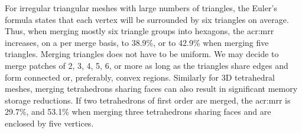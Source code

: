 For irregular triangular meshes with large numbers of triangles, the Euler's formula \cite[p.~28]{bib:Berg2008CGA} states that each vertex will be surrounded by six triangles on average.
Thus, when merging mostly six triangle groups into hexagons, the \gls{acr:mrr} increases, on a per merge basis, to 38.9\%, or to 42.9\% when merging five triangles.
Merging triangles does not have to be uniform.
We may decide to merge patches of 2, 3, 4, 5, 6, or more as long as the triangles share edges and form connected or, preferably, convex regions.
Similarly for 3D tetrahedral meshes, merging tetrahedrons sharing faces can also result in significant memory storage reductions.
If two tetrahedrons of first order are merged, the \gls{acr:mrr} is 29.7\%, and 53.1\% when merging three tetrahedrons sharing faces and are enclosed by five vertices.


